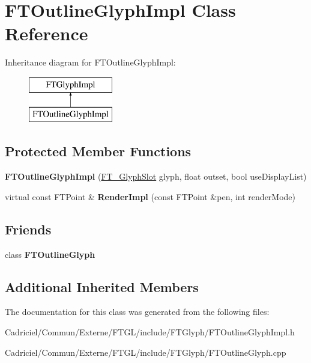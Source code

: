 \hypertarget{class_f_t_outline_glyph_impl}{}\section{F\+T\+Outline\+Glyph\+Impl Class Reference}
\label{class_f_t_outline_glyph_impl}
Inheritance diagram for F\+T\+Outline\+Glyph\+Impl\+:\begin{figure}[H]
\begin{center}
\leavevmode
\includegraphics[height=2.000000cm]{class_f_t_outline_glyph_impl}
\end{center}
\end{figure}
\subsection*{Protected Member Functions}
\begin{DoxyCompactItemize}
\item 
{\bfseries F\+T\+Outline\+Glyph\+Impl} (\hyperlink{struct_f_t___glyph_slot_rec__}{F\+T\+\_\+\+Glyph\+Slot} glyph, float outset, bool use\+Display\+List)\hypertarget{class_f_t_outline_glyph_impl_a0eac191ec3db6c8dbbf6956ded4342fa}{}\label{class_f_t_outline_glyph_impl_a0eac191ec3db6c8dbbf6956ded4342fa}

\item 
virtual const F\+T\+Point \& {\bfseries Render\+Impl} (const F\+T\+Point \&pen, int render\+Mode)\hypertarget{class_f_t_outline_glyph_impl_a554ed38dfe9a113804394c35e9ef9d35}{}\label{class_f_t_outline_glyph_impl_a554ed38dfe9a113804394c35e9ef9d35}

\end{DoxyCompactItemize}
\subsection*{Friends}
\begin{DoxyCompactItemize}
\item 
class {\bfseries F\+T\+Outline\+Glyph}\hypertarget{class_f_t_outline_glyph_impl_accb6ff0274a52a67e706edda49d6a201}{}\label{class_f_t_outline_glyph_impl_accb6ff0274a52a67e706edda49d6a201}

\end{DoxyCompactItemize}
\subsection*{Additional Inherited Members}


The documentation for this class was generated from the following files\+:\begin{DoxyCompactItemize}
\item 
Cadriciel/\+Commun/\+Externe/\+F\+T\+G\+L/include/\+F\+T\+Glyph/F\+T\+Outline\+Glyph\+Impl.\+h\item 
Cadriciel/\+Commun/\+Externe/\+F\+T\+G\+L/include/\+F\+T\+Glyph/F\+T\+Outline\+Glyph.\+cpp\end{DoxyCompactItemize}
